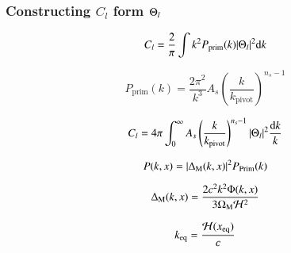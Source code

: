     \subsubsection{Constructing $C_l$ form $\Theta_l$}
        

    \begin{equation}\label{eq:m4:theory:Cl_integral_intermediate}
        C_l = \frac{2}{\pi}\int k^2 P_\mathrm{prim}(k)\abs{\Theta_l}^2\mathrm{d} k
    \end{equation}

    \begin{equation}\label{eq:m4:theory:primordial_power_spectrum}
        P_\mathrm{prim}(k) = \frac{2\pi^2}{k^3}A_s\left(\frac{k}{k_\mathrm{pivot}}\right)^{n_s-1}
    \end{equation}

    \begin{equation}
        C_l = 4\pi\int_0^\infty A_s\left(\frac{k}{k_\mathrm{pivot}}\right)^{n_s-1}\abs{\Theta_l}^2\frac{\mathrm{d} k}{k}
    \end{equation}

    \begin{equation}\label{eq:m4:theory:matter_power_spectrum}
        P(k,x) = \abs{\Delta_\mathrm{M}(k,x)}^2P_\mathrm{Prim}(k)
    \end{equation}

    \begin{equation}
        \Delta_\mathrm{M}(k,x) = \frac{2c^2k^2\Phi(k,x)}{3\Omega_\mathrm{M}\mathcal{H}^2}
    \end{equation}

    \begin{equation}
        k_\mathrm{eq} = \frac{\mathcal{H}(x_\mathrm{eq})}{c}
    \end{equation}
